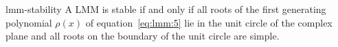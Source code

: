 \begin{Theorem}{lmm-stability}
  A LMM is stable if and only if all roots of the first
  generating polynomial $\rho(x)$ of equation~\eqref{eq:lmm:5} lie
  in the unit circle of the complex plane and all roots on the
  boundary of the unit circle are simple.
\end{Theorem}


